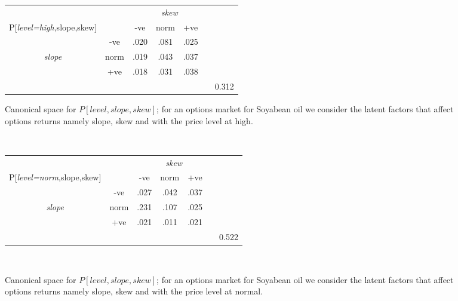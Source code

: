 \documentclass[7pt]{article}
\begin{document}
\begin{figure*}
\centering
\begin{minipage}[t]{0.52\textwidth} 
\centering
\begin{tabular}{ c | c |c c c c||c} 
																		&				&  	\multicolumn{4}{c}{\emph{skew}} \\
P[\emph{level=high},slope,skew]						 &	 			  &  -ve  		&  	norm	  & +ve 		& & \\ 
\hline
																		& -ve	      & .020 	  & .081 & .025  &  & \\
\emph{slope}	 												& norm    	& .019  	   & .043  & .037  & &  \\
																		& +ve	   	 & .018  	 & .031   & .038  & & \\
\hline
\hline
																		& 			     &  		    & 					& 				&  & 0.312 \\
\end{tabular}
\caption{Canonical space for  $P[{level},slope,skew]$; for an options market for Soyabean oil we consider the latent factors that affect options returns namely slope, skew and with the price {level at high}.}
\label{canonical_space1}
\end{minipage}
\\
\centering
\begin{minipage}[t]{0.52\textwidth} 
\centering
\vspace{20 mm}
\begin{tabular}{ c | c |c c c c||c} 
																		&				&  	\multicolumn{4}{c}{\emph{skew}}\\
P[\emph{level=norm},slope,skew]						&	 			  &  -ve  		&  	norm	  & +ve 		& &\\ 
\hline
																		& -ve	      & .027 	  & .042  & .037  &  &\\
\emph{slope}	 												& norm    	& .231  	 & .107  & .025  & & \\
																		& +ve	   	 & .021   	  & .011   & .021  & &\\
\hline
\hline
																		& 			     &  		    & 					& 				&  & 0.522\\
\end{tabular}
\caption{Canonical space for  $P[{level},slope,skew]$; for an options market for Soyabean oil we consider the latent factors that affect options returns namely slope, skew and with the price {level at normal}.}
\label{canonical_space3}
\end{minipage}
\\
\begin{minipage}[t]{0.52\textwidth} 

\end{minipage}
\end{figure*}
\end{document}
